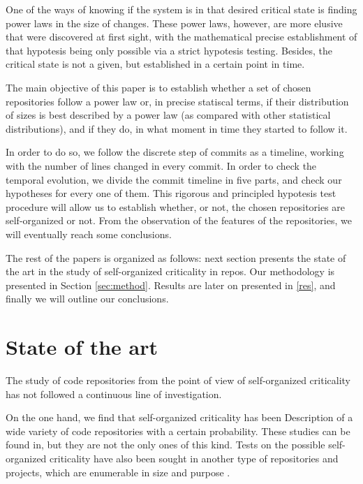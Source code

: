 \documentclass[conference]{IEEEtran}
\begin{document}
One of the ways of knowing if the system is in that desired critical
state is finding power laws in the size of changes. These power laws,
however, are more elusive that were discovered at first sight, with
the mathematical precise establishment of that hypotesis being only
possible via a strict hypotesis testing. Besides, the critical state
is not a given, but established in a certain point in time.

The main objective of this paper is to establish whether a set of
chosen repositories follow a power law or, in precise statiscal terms,
if their distribution of sizes is best described by a power law (as
compared with other statistical distributions), and if they do, in what moment
in time they started to follow it.

In order to do so, we follow the discrete step of commits as a
timeline, working with the number of lines changed in every commit. In
order to check the temporal evolution, we divide the commit timeline
in five parts, and check our hypotheses for every one of them. This
rigorous and principled hypotesis test procedure will allow us to
establish whether, or not, the chosen repositories are self-organized
or not. From the observation of the features of the repositories, we
will eventually reach some conclusions.


The rest of the papers is organized as follows: next section presents
the state of the art in the study of self-organized criticality in
repos. Our methodology is presented in Section
\ref{sec:method}. Results are later on presented in \ref{res}, and
finally we will outline our conclusions.

\section{State of the art}\label{soa}


The study of code repositories from the point of view of self-organized criticality has not followed a continuous line of investigation.

On the one hand, we find that self-organized criticality has been
Description of a wide variety of code repositories with a certain probability. These studies can be found in\cite{wu2007empirical,gorshenev2004punctuated}, but they are not the only ones of this kind. Tests on the possible self-organized criticality have also been sought in another type of repositories and projects, which are enumerable in size and purpose \cite{Merelo2016:repomining,merelo16:slash,merelo16:self,merelo2017self}.
\end{document}
